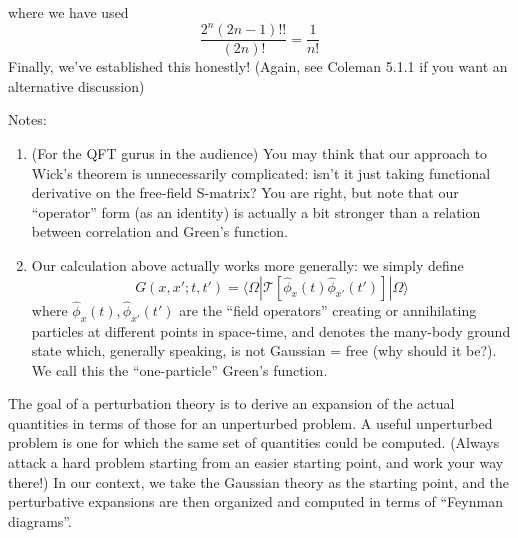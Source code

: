 where we have used
\[ \frac{2^n\left( 2n-1 \right) !!}{\left( 2n \right) !}=\frac{1}{n!}\]
Finally, we've established this honestly! (Again, see Coleman 5.1.1 if you want an alternative discussion)

Notes:

\begin{enumerate}
    \item (For the QFT gurus in the audience) You may think that our approach to Wick's theorem is unnecessarily complicated: isn't it just taking functional derivative on the free-field S-matrix? You are right, but note that our ``operator'' form (as an identity) is actually a bit stronger than a relation between correlation and Green's function.
    \item Our calculation above actually works more generally: we simply define
    \[ G\left( x,x';t,t' \right) =\langle \Omega |\mathcal{T} \left[ \hat{\phi}_x\left( t \right) \hat{\phi}_{x'}\left( t' \right) \right] |\Omega \rangle \]
    where $\hat{\phi}_x\left( t \right) ,\hat{\phi}_{x'}\left( t' \right)$ are the ``field operators'' creating or annihilating particles at different points in space-time, and denotes the many-body ground state which, generally speaking, is not Gaussian = free (why should it be?). We call this the ``one-particle'' Green's function.
\end{enumerate}

The goal of a perturbation theory is to derive an expansion of the actual quantities in terms of those for an unperturbed problem. A useful unperturbed problem is one for which the same set of quantities could be computed. (Always attack a hard problem starting from an easier starting point, and work your way there!) In our context, we take the Gaussian theory as the starting point, and the perturbative expansions are then organized and computed in terms of ``Feynman diagrams''.

